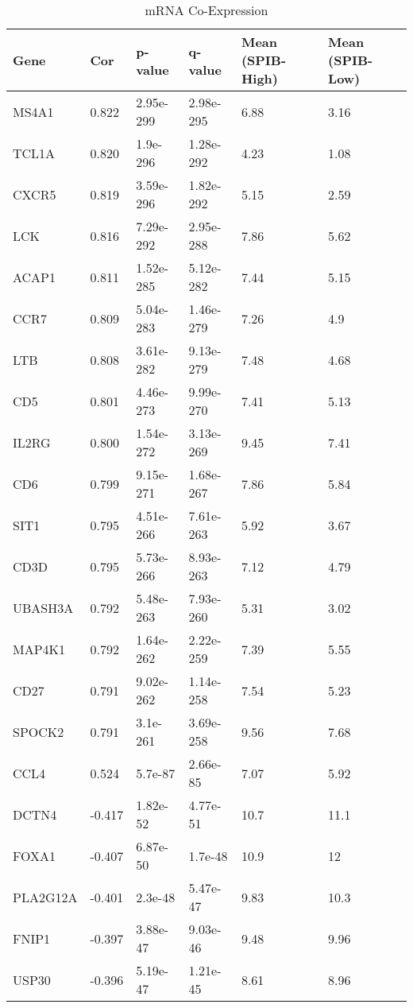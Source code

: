 \begin{table}[!p]
    \centering
    \caption{mRNA Co-Expression}
    \begin{center}
    \begin{tabular}{l|lllll}
        Gene	&	Cor	&	p-value	&	q-value	&	Mean (SPIB-High)	&	Mean (SPIB-Low) \\ \hline
        MS4A1	&	0.822	&	2.95e-299	&	2.98e-295	&	6.88	&	3.16\\ 
        TCL1A	&	0.820	&	1.9e-296	&	1.28e-292	&	4.23	&	1.08\\ 
        CXCR5	&	0.819	&	3.59e-296	&	1.82e-292	&	5.15	&	2.59\\ 
        LCK	&	0.816	&	7.29e-292	&	2.95e-288	&	7.86	&	5.62\\ 
        ACAP1	&	0.811	&	1.52e-285	&	5.12e-282	&	7.44	&	5.15\\ 
        CCR7	&	0.809	&	5.04e-283	&	1.46e-279	&	7.26	&	4.9\\ 
        LTB	&	0.808	&	3.61e-282	&	9.13e-279	&	7.48	&	4.68\\ 
        CD5	&	0.801	&	4.46e-273	&	9.99e-270	&	7.41	&	5.13\\ 
        IL2RG	&	0.800	&	1.54e-272	&	3.13e-269	&	9.45	&	7.41\\ 
        CD6	&	0.799	&	9.15e-271	&	1.68e-267	&	7.86	&	5.84\\ 
        SIT1	&	0.795	&	4.51e-266	&	7.61e-263	&	5.92	&	3.67\\ 
        CD3D	&	0.795	&	5.73e-266	&	8.93e-263	&	7.12	&	4.79\\ 
        UBASH3A	&	0.792	&	5.48e-263	&	7.93e-260	&	5.31	&	3.02\\ 
        MAP4K1	&	0.792	&	1.64e-262	&	2.22e-259	&	7.39	&	5.55\\ 
        CD27	&	0.791	&	9.02e-262	&	1.14e-258	&	7.54	&	5.23\\ 
        SPOCK2	&	0.791	&	3.1e-261	&	3.69e-258	&	9.56	&	7.68\\ 
        CCL4	&	0.524	&	5.7e-87	&	2.66e-85	&	7.07	&	5.92\\ \hline
        DCTN4	&	-0.417	&	1.82e-52	&	4.77e-51	&	10.7	&	11.1\\ 
        FOXA1	&	-0.407	&	6.87e-50	&	1.7e-48	&	10.9	&	12\\ 
        PLA2G12A	&	-0.401	&	2.3e-48	&	5.47e-47	&	9.83	&	10.3\\ 
        FNIP1	&	-0.397	&	3.88e-47	&	9.03e-46	&	9.48	&	9.96\\ 
        USP30	&	-0.396	&	5.19e-47	&	1.21e-45	&	8.61	&	8.96\\ 

\end{tabular}
\end{center}
\end{table}
